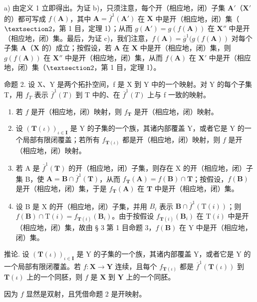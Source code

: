 a) 由定义 1 立即得出。为证 b)，只须注意，每个开（相应地，闭）子集 \(\mathbf{A}'\)（\(\mathbf{X}'\) 的）都可写成 \(f(\mathbf{A})\)，其中 \(\mathbf{A} = \overline{f}^{1}(\mathbf{A}')\) 在 \(\mathbf{X}\) 中是开（相应地，闭）集（\(\S 2\)，第 1 目，定理 1）；从而 \(g(\mathbf{A}') = g(f(\mathbf{A}))\) 在 \(\mathbf{X}''\) 中是开（相应地，闭）集。最后，为证 c)，我们注意，\(f(\mathbf{A}) = \overline{g}^{1}(g(f(\mathbf{A}))\) 对每个子集 \(\mathbf{A}\)（\(\mathbf{X}\) 的）成立；按假设，若 \(\mathbf{A}\) 在 \(\mathbf{X}\) 中是开（相应地，闭）集，则 \(g(f(\mathbf{A}))\) 在 \(\mathbf{X}''\) 中是开（相应地，闭）集，从而 \(f(\mathbf{A})\) 在 \(\mathbf{X}'\) 中是开（相应地，闭）集（\(\S 2\)，第 1 目，定理 1）。

命题 2. 设 X、Y 是两个拓扑空间，f 是 X 到 Y 中的一个映射。对 Y 的每个子集 T，用 \(f_{T}\) 表示 \(\overline{f}^{1}(T)\) 到 T 中的、在 \(\overline{f}^{1}(T)\) 上与 f 一致的映射。

\begin{enumerate}
\def\labelenumi{\alph{enumi})}
\item
  若 \(f\) 是开（相应地，闭）映射，则 \(f_{\mathbf{T}}\) 是开（相应地，闭）映射。
\item
  设 \((\mathbf{T}(\iota))_{\iota \in \mathbf{I}}\) 是 Y 的子集的一个族，其诸内部覆盖 Y，或者它是 Y 的一个局部有限闭覆盖；若所有 \(f_{\mathbf{T}(\iota)}\) 都是开（相应地，闭）映射，则 \(f\) 是开（相应地，闭）映射。
\item
  若 A 是 \(\overline{f}^{1}(\mathbf{T})\) 的开（相应地，闭）子集，则存在 X 的开（相应地，闭）子集 B，使 \(\mathbf{A} = \mathbf{B} \cap \overline{f}^{1}(\mathbf{T})\)，从而 \(f_{\mathbf{T}}(\mathbf{A}) = f(\mathbf{B}) \cap \mathbf{T}\)；按假设，\(f(\mathbf{B})\) 是开（相应地，闭）集，于是 \(f_{\mathbf{T}}(\mathbf{A})\) 在 \(\mathbf{T}\) 中是开（相应地，闭）集。
\item
  设 B 是 X 的开（相应地，闭）子集，并用 \(B_{i}\) 表示 \(\mathbf{B} \cap \overline{f}^{1}(\mathrm{T}(i))\)；则 \(f(\mathbf{B}) \cap \mathrm{T}(i) = f_{\mathbf{T}(i)}(\mathbf{B}_{i})\)。由于按假设 \(f_{\mathbf{T}(i)}(\mathbf{B}_{i})\) 在 \(\mathrm{T}(i)\) 中是开（相应地，闭）集，故由 § 3 第 1 目命题 3，\(f(\mathbf{B})\) 在 Y 中是开（相应地，闭）集。
\end{enumerate}

推论. 设 \((\mathbf{T}(\iota))_{\iota \in \mathbf{I}}\) 是 Y 的子集的一个族，其诸内部覆盖 Y，或者它是 Y 的一个局部有限闭覆盖。若 \(f: \mathbf{X} \to \mathbf{Y}\) 连续，且每个 \(f_{\mathbf{T}(\iota)}\) 都是 \(\overline{f}^1 (\mathbf{T}(\iota))\) 到 \(\mathbf{T}(\iota)\) 上的一个同胚，则 \(f\) 是 \(\mathbf{X}\) 到 \(\mathbf{Y}\) 上的一个同胚。

因为 \(f\) 显然是双射，且凭借命题 2 是开映射。

